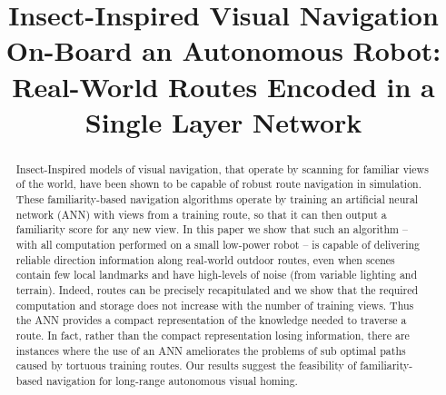 \documentclass[letterpaper]{article}
\title{Insect-Inspired Visual Navigation On-Board an Autonomous Robot:\\ Real-World Routes Encoded in a Single Layer Network}
\author{James C. Knight$^{1}$, Daniil Sakhapov$^{2}$, Norbert Domcsek$^{1}$, Alex Dewar$^{1}$,\\ 
{\Large Paul Graham$^{1}$, Thomas Nowotny$^{1}$ \and Andrew Philippides$^{1}$} \\
\mbox{}\\
$^1$Centre for Computational Neuroscience and Robotics, University of Sussex, Brighton, UK \\
$^2$Department of Computer Science, Tomsk State University, Tomsk, Russia \\
J.C.Knight@sussex.ac.uk} %
\begin{document}
\maketitle

\begin{abstract}
Insect-Inspired models of visual navigation, that operate by scanning for familiar views of the world, have been shown to be capable of robust route navigation in simulation. 
These familiarity-based navigation algorithms operate by training an artificial neural network (ANN) with views from a training route, so that it can then output a familiarity score for any new view.
In this paper we show that such an algorithm -- with all computation performed on a small low-power robot -- is capable of delivering reliable direction information along real-world outdoor routes, even when scenes contain few local landmarks and have high-levels of noise (from variable lighting and terrain).
Indeed, routes can be precisely recapitulated and we show that the required computation and storage does not increase with the number of training views.
Thus the ANN provides a compact representation of the knowledge needed to traverse a route.
In fact, rather than the compact representation losing information, there are instances where the use of an ANN ameliorates the problems of sub optimal paths caused by tortuous training routes.
Our results suggest the feasibility of familiarity-based navigation for long-range autonomous visual homing.
\end{abstract}
\end{document}
